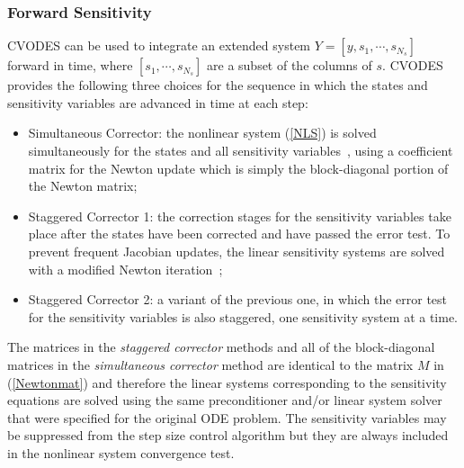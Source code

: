 \subsubsection{Forward Sensitivity}
CVODES can be used to integrate an extended system 
$Y = [y,s_1,\cdots,s_{N_s}]$ forward in time, where
$[s_1,\cdots,s_{N_s}]$ are a subset of the columns of $s$.
%
CVODES provides the following three choices for the sequence in which
the states and sensitivity variables are advanced in time at each step:
%
\begin{itemize}
\item Simultaneous Corrector: the nonlinear system (\ref{NLS}) is solved
  simultaneously for the states and all sensitivity variables~\cite{MaPe:97},
  using a coefficient matrix for the Newton update which is
  simply the block-diagonal portion of the Newton matrix;
\item Staggered Corrector 1: the correction stages for the sensitivity 
  variables take place after the states have been corrected and have passed 
  the error test. To prevent frequent Jacobian updates, the linear sensitivity 
  systems are solved with a modified Newton iteration~\cite{FTB:97};
\item Staggered Corrector 2: a variant of the previous one,
  in which the error test for the sensitivity variables is also staggered,
  one sensitivity system at a time.
\end{itemize}
%
The matrices in the {\em staggered corrector} methods and all of the 
block-diagonal matrices in the {\em simultaneous corrector} method are 
identical to the matrix $M$ in (\ref{Newtonmat}) and 
therefore the linear systems corresponding to the sensitivity equations
are solved using the same preconditioner and/or linear system solver that 
were specified for the original ODE problem. 
The sensitivity variables may be suppressed from the step size control
algorithm but they are always included in the nonlinear system convergence
test.

